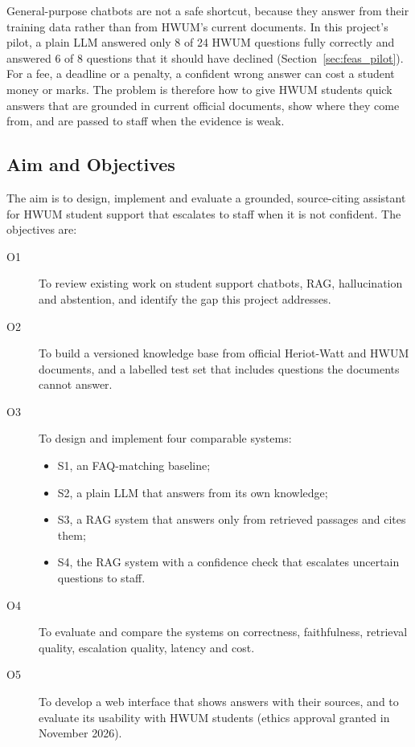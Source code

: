 \documentclass[12pt,nonacm,acmlarge,titlepage,screen]{acmart}
\begin{document}
General-purpose chatbots are not a safe shortcut, because they answer from their training data rather than from HWUM's current documents. In this project's pilot, a plain LLM answered only 8 of 24 HWUM questions fully correctly and answered 6 of 8 questions that it should have declined (Section~\ref{sec:feas_pilot}). For a fee, a deadline or a penalty, a confident wrong answer can cost a student money or marks. The problem is therefore how to give HWUM students quick answers that are grounded in current official documents, show where they come from, and are passed to staff when the evidence is weak.

\subsection{Aim and Objectives} \label{sec:intro_aim}

The aim is to design, implement and evaluate a grounded, source-citing assistant for HWUM student support that escalates to staff when it is not confident. The objectives are:

\begin{description}
  \item[O1] To review existing work on student support chatbots, RAG, hallucination and abstention, and identify the gap this project addresses.
  \item[O2] To build a versioned knowledge base from official Heriot-Watt and HWUM documents, and a labelled test set that includes questions the documents cannot answer.
  \item[O3] To design and implement four comparable systems:
  \begin{itemize}
    \item S1, an FAQ-matching baseline;
    \item S2, a plain LLM that answers from its own knowledge;
    \item S3, a RAG system that answers only from retrieved passages and cites them;
    \item S4, the RAG system with a confidence check that escalates uncertain questions to staff.
  \end{itemize}
  \item[O4] To evaluate and compare the systems on correctness, faithfulness, retrieval quality, escalation quality, latency and cost.
  \item[O5] To develop a web interface that shows answers with their sources, and to evaluate its usability with HWUM students (ethics approval granted in November 2026).
\end{description}
\end{document}
